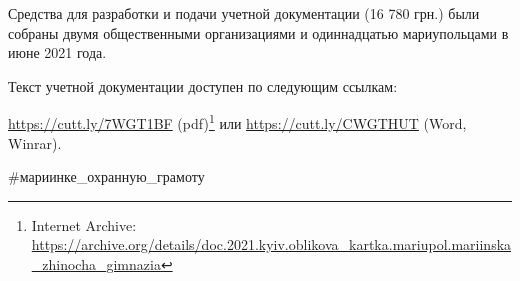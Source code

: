 Средства для разработки и подачи учетной документации (16 780 грн.) были
собраны двумя общественными организациями и одиннадцатью мариупольцами в июне
2021 года.

Текст учетной документации доступен по следующим ссылкам: 

\url{https://cutt.ly/7WGT1BF} (pdf)\footnote{Internet Archive: \url{https://archive.org/details/doc.2021.kyiv.oblikova_kartka.mariupol.mariinska_zhinocha_gimnazia}} или \url{https://cutt.ly/CWGTHUT} (Word, Winrar).

\#мариинке\_охранную\_грамоту

